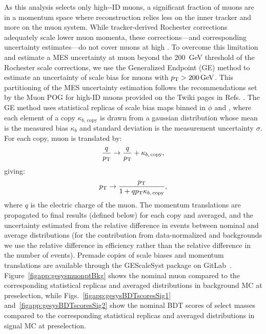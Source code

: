 As this analysis selects only high-\pt-ID muons, a significant fraction of muons are in a momentum space where reconstruction relies less on the inner tracker and more on the muon system. While tracker-derived Rochester corrections adequately scale lower muon momenta, these corrections---and corresponding uncertainty estimates---do not cover muons at high \pt. To overcome this limitation and estimate a MES uncertainty at muon \pt beyond the \SI{200}{\GeV} threshold of the Rochester scale corrections, we use the Generalized Endpoint (GE) method to estimate an uncertainty of scale bias for muons with $\pt > \SI{200}{\GeV}$. This partitioning of the MES uncertainty estimation follows the recommendations set by the Muon POG for high-\pt ID muons provided on the Twiki pages in Refs. \cite{MuonTwiki2016,MuonTwiki2018}. The GE method uses statistical replicas of scale bias maps binned in $\phi$ and \pseudorap, where each element of a copy $\kappa_{b,\,\text{copy}}$ is drawn from a gaussian distribution whose mean is the measured bias $\kappa_b$ and standard deviation is the measurement uncertainty $\sigma$. For each copy, muon \pt is translated by:
\begin{equation}
    \frac{q}{p_{\mathrm{T}}} \rightarrow \frac{q}{p_{\mathrm{T}}} + \kappa_{b,\,\text{copy}},
\end{equation}
giving:
\begin{equation}
    p_{\mathrm{T}} \rightarrow \frac{p_{\mathrm{T}}}{1 + qp_{\mathrm{T}}\kappa_{b,\,\text{copy}}},
\end{equation}
where $q$ is the electric charge of the muon. The momentum translations are propagated to final results (defined below) for each copy and averaged, and the uncertainty estimated from the relative difference in events between nominal and average distributions (for the contribution from data-normalized \ZJETS and \ttbar backgrounds we use the relative difference in efficiency rather than the relative difference in the number of events). Premade copies of scale biases and momentum translations are available through the GEScaleSyst package on GitLab~\cite{GEScaleSyst}. Figure~\ref{figapp:gesysmuonptBkg} shows the nominal muon \pt compared to the corresponding statistical replicas and averaged distributions in background MC at preselection, while Figs.~\ref{figapp:gesysBDTscoresSig1} and~\ref{figapp:gesysBDTscoresSig2} show the nominal BDT scores of select masses compared to the corresponding statistical replicas and averaged distributions in signal MC at preselection. 

